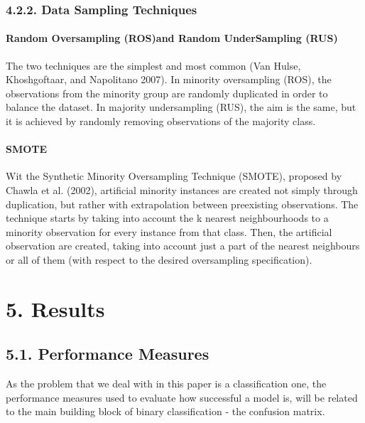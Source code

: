 \documentclass[12pt,]{article}
\let\oldparagraph\paragraph
\renewcommand{\paragraph}[1]{\oldparagraph{#1}\mbox{}}
\begin{document}
\hypertarget{data-sampling-techniques}{%
\subsubsection{4.2.2. Data Sampling
Techniques}\label{data-sampling-techniques}}

\hypertarget{random-oversampling-rosand-random-undersampling-rus}{%
\paragraph{Random Oversampling (ROS)and Random UnderSampling
(RUS)}\label{random-oversampling-rosand-random-undersampling-rus}}

The two techniques are the simplest and most common (Van Hulse,
Khoshgoftaar, and Napolitano 2007). In minority oversampling (ROS), the
observations from the minority group are randomly duplicated in order to
balance the dataset. In majority undersampling (RUS), the aim is the
same, but it is achieved by randomly removing observations of the
majority class.

\hypertarget{smote}{%
\paragraph{SMOTE}\label{smote}}

Wit the Synthetic Minority Oversampling Technique (SMOTE), proposed by
Chawla et al. (2002), artificial minority instances are created not
simply through duplication, but rather with extrapolation between
preexisting observations. The technique starts by taking into account
the k nearest neighbourhoods to a minority observation for every
instance from that class. Then, the artificial observation are created,
taking into account just a part of the nearest neighbours or all of them
(with respect to the desired oversampling specification).

\hypertarget{results}{%
\section{5. Results}\label{results}}

\hypertarget{performance-measures}{%
\subsection{5.1. Performance Measures}\label{performance-measures}}

As the problem that we deal with in this paper is a classification one,
the performance measures used to evaluate how successful a model is,
will be related to the main building block of binary classification -
the confusion matrix.
\end{document}
